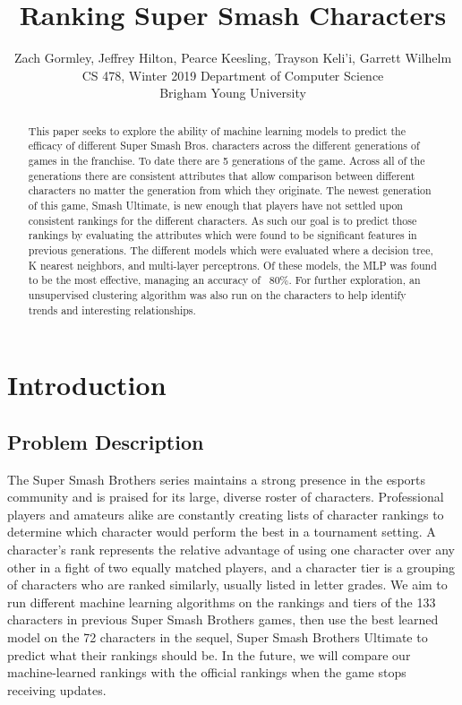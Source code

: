 \documentclass{article}
\title{Ranking Super Smash Characters}
\author{Zach Gormley, Jeffrey Hilton, Pearce Keesling, Trayson Keli'i, Garrett Wilhelm\\
CS 478, Winter 2019
Department of Computer Science\\
Brigham Young University}
\begin{document}
\maketitle

\begin{abstract}
This paper seeks to explore the ability of machine learning models to predict the efficacy of different Super Smash Bros. characters across the different generations of games in the franchise. To date there are 5 generations of the game. Across all of the generations there are consistent attributes that allow comparison between different characters no matter the generation from which they originate. The newest generation of this game, Smash Ultimate, is new enough that players have not settled upon consistent rankings for the different characters. As such our goal is to predict those rankings by evaluating the attributes which were found to be significant features in previous generations. The different models which were evaluated where a decision tree, K nearest neighbors, and multi-layer perceptrons. Of these models, the MLP was found to be the most effective, managing an accuracy of
~80\%. %
For further exploration, an unsupervised clustering algorithm was also run on the characters to help identify trends and interesting relationships.
\end{abstract}

\section{Introduction}
\subsection{Problem Description}
The Super Smash Brothers series maintains a strong presence in the esports community and is praised for its large, diverse roster of characters. Professional players and amateurs alike are constantly creating lists of character rankings to determine which character would perform the best in a tournament setting. A character’s rank represents the relative advantage of using one character over any other in a fight of two equally matched players, and a character tier is a grouping of characters who are ranked similarly, usually listed in letter grades. We aim to run different machine learning algorithms on the rankings and tiers of the 133 characters in previous Super Smash Brothers games, then use the best learned model on the 72 characters in the sequel, Super Smash Brothers Ultimate to predict what their rankings should be. In the future, we will compare our machine-learned rankings with the official rankings when the game stops receiving updates.
\end{document}
